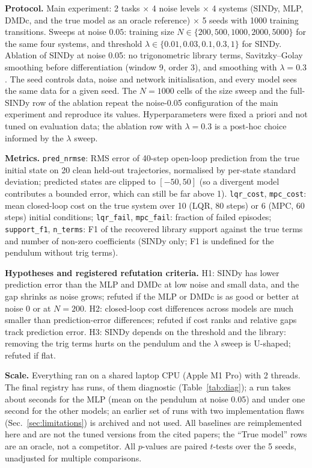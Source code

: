 \textbf{Protocol.} Main experiment: 2 tasks $\times$ 4 noise levels $\times$ 4 systems (SINDy, MLP, DMDc, and the true model as an oracle reference) $\times$ 5 seeds with 1000 training transitions. Sweeps at noise $0.05$: training size $N\in\{200,500,1000,2000,5000\}$ for the same four systems, and threshold $\lambda\in\{0.01,0.03,0.1,0.3,1\}$ for SINDy. Ablation of SINDy at noise 0.05: no trigonometric library terms, Savitzky--Golay smoothing before differentiation (window 9, order 3), and smoothing with $\lambda=0.3$. The seed controls data, noise and network initialisation, and every model sees the same data for a given seed. The $N=1000$ cells of the size sweep and the full-SINDy row of the ablation repeat the noise-0.05 configuration of the main experiment and reproduce its values. Hyperparameters were fixed a priori and not tuned on evaluation data; the ablation row with $\lambda=0.3$ is a post-hoc choice informed by the $\lambda$ sweep.

\textbf{Metrics.} \texttt{pred\_nrmse}: RMS error of 40-step open-loop prediction from the true initial state on 20 clean held-out trajectories, normalised by per-state standard deviation; predicted states are clipped to $[-50,50]$ (so a divergent model contributes a bounded error, which can still be far above 1). \texttt{lqr\_cost}, \texttt{mpc\_cost}: mean closed-loop cost on the true system over 10 (LQR, 80 steps) or 6 (MPC, 60 steps) initial conditions; \texttt{lqr\_fail}, \texttt{mpc\_fail}: fraction of failed episodes; \texttt{support\_f1}, \texttt{n\_terms}: F1 of the recovered library support against the true terms and number of non-zero coefficients (SINDy only; F1 is undefined for the pendulum without trig terms).

\textbf{Hypotheses and registered refutation criteria.} H1: SINDy has lower prediction error than the MLP and DMDc at low noise and small data, and the gap shrinks as noise grows; refuted if the MLP or DMDc is as good or better at noise 0 or at $N=200$. H2: closed-loop cost differences across models are much smaller than prediction-error differences; refuted if cost ranks and relative gaps track prediction error. H3: SINDy depends on the threshold and the library: removing the trig terms hurts on the pendulum and the $\lambda$ sweep is U-shaped; refuted if flat.

\textbf{Scale.} Everything ran on a shared laptop CPU (Apple M1 Pro) with 2 threads. The final registry has  runs,  of them diagnostic (Table~\ref{tab:diag}); a run takes about  seconds for the MLP (mean on the pendulum at noise 0.05) and under one second for the other models; an earlier set of runs with two implementation flaws (Sec.~\ref{sec:limitations}) is archived and not used. All baselines are reimplemented here and are not the tuned versions from the cited papers; the ``True model'' rows are an oracle, not a competitor. All $p$-values are paired $t$-tests over the 5 seeds, unadjusted for multiple comparisons.
